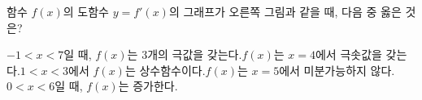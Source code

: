 \noindent\begin{minipage}[t]{0.58\linewidth}\vspace{0pt}\raggedright 함수 $f(x)$의 도함수 $y=f'(x)$의 그래프가 오른쪽 그림과 같을 때, 다음 중 옳은 것은?\end{minipage}\hfill\begin{minipage}[t]{0.4\linewidth}\vspace{0pt}\centering \resizebox{\ifdim\width>\linewidth\linewidth\else\width\fi}{!}{}\end{minipage}\par
\begin{choicesv}{$-1<x<7$일 때, $f(x)$는 $3$개의 극값을 갖는다.}{$f(x)$는 $x=4$에서 극솟값을 갖는다.}{$1<x<3$에서 $f(x)$는 상수함수이다.}{$f(x)$는 $x=5$에서 미분가능하지 않다.}{$0<x<6$일 때, $f(x)$는 증가한다.}\end{choicesv}
